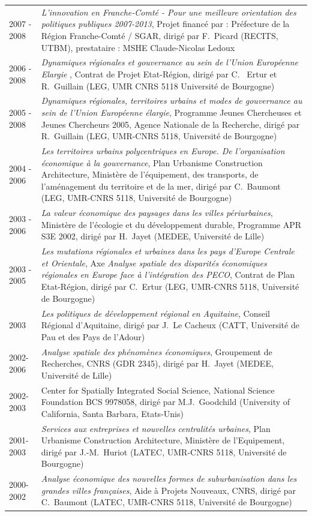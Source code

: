 \documentclass[a4paper,12pt]{article}
\begin{document}
\begin{longtable}{@{}p{\annee}p{\texte}@{}}
2007 - 2008 & \og{}\textit{L'innovation en Franche-Comté - Pour une meilleure orientation des politiques publiques 2007-2013}\fg{}, Projet financé par : Préfecture de la Région Franche-Comté / SGAR, dirigé par F.~Picard (RECITS, UTBM), prestataire : MSHE Claude-Nicolas Ledoux \\
2006 - 2008 & \og{}\textit{Dynamiques régionales et gouvernance au sein de l'Union Européenne Elargie }\fg{}, Contrat de Projet Etat-Région, dirigé par C.~ Ertur et R.~Guillain (LEG, UMR CNRS 5118 Université de Bourgogne) \\
2005 - 2008 & \og{}\textit{Dynamiques régionales, territoires urbains et modes de gouvernance au sein de l'Union Européenne élargie}\fg{}, Programme Jeunes Chercheuses et Jeunes Chercheurs 2005, Agence Nationale de la Recherche, dirigé par R.~Guillain (LEG, UMR-CNRS 5118, Université de Bourgogne) \\
2004 - 2006 & \og{}\textit{Les territoires urbains polycentriques en Europe. De l'organisation économique à la gouvernance}\fg{}, Plan Urbanisme Construction Architecture, Ministère de l'équipement, des transports, de l'aménagement du territoire et de la mer, dirigé par C.~Baumont (LEG, UMR-CNRS 5118, Université de Bourgogne) \\
2003 - 2006 & \og{}\textit{La valeur économique des paysages dans les villes périurbaines}\fg{}, Ministère de l'écologie et du développement durable, Programme APR S3E 2002, dirigé par H.~Jayet (MEDEE, Université de Lille) \\
2003 - 2005 & \og{}\textit{Les mutations régionales et urbaines dans les pays d'Europe Centrale et Orientale}\fg{}, Axe \og{}\textit{Analyse spatiale des disparités économiques régionales en Europe face à l'intégration des PECO}\fg{}, Contrat de Plan Etat-Région, dirigé par C.~Ertur (LEG, UMR-CNRS 5118, Université de Bourgogne) \\
2003 		& \og{}\textit{Les politiques de développement régional en Aquitaine}\fg{}, Conseil Régional d'Aquitaine, dirigé par J.~Le Cacheux (CATT, Université de Pau et des Pays de l'Adour) \\
2002-2006 	& \og{}\textit{Analyse spatiale des phénomènes économiques}\fg{}, Groupement de Recherches, CNRS (GDR 2345), dirigé par H.~Jayet (MEDEE, Université de Lille) \\
2002-2003 	& Center for Spatially Integrated Social Science, National Science Foundation BCS 9978058, dirigé par M.J.~Goodchild (University of California, Santa Barbara, Etats-Unis) \\
2001-2003 	& \og{}\textit{Services aux entreprises et nouvelles centralités urbaines}\fg{}, Plan Urbanisme Construction Architecture, Ministère de l'Equipement, dirigé par J.-M.~Huriot (LATEC, UMR-CNRS 5118, Université de Bourgogne) \\
2000-2002 	& \og{}\textit{Analyse économique des nouvelles formes de suburbanisation dans les grandes villes françaises}\fg{}, Aide à Projets Nouveaux, CNRS, dirigé par C.~Baumont (LATEC, UMR-CNRS 5118, Université de Bourgogne)
\end{longtable}
\end{document}
